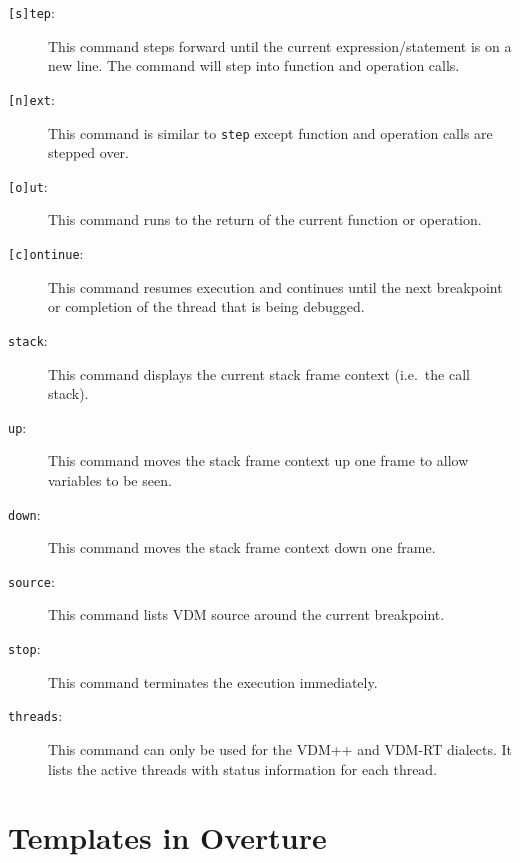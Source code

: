 \documentclass{overturerepchap}
\begin{document}
\begin{description}
\item[\texttt{[s]tep}:] This command steps forward until the
  current expression/statement is on a new line. The command will step
  into function and operation calls. 
\item[\texttt{[n]ext}:] This command is similar to \texttt{step} except
 function and operation calls are stepped over.  
\item[\texttt{[o]ut}:] This command runs to the return of the current
  function or operation. 
\item[\texttt{[c]ontinue}:] This command resumes execution and continues
  until the next breakpoint or completion of the thread that is being
  debugged. 
\item[\texttt{stack}:] This command displays the current stack frame
  context (i.e.\ the call stack). 
\item[\texttt{up}:] This command moves the stack frame context up one
  frame to allow variables to be seen.  
\item[\texttt{down}:] This command moves the stack frame context down
  one frame.  
\item[\texttt{source}:] This command lists VDM source around the
  current breakpoint.  
\item[\texttt{stop}:] This command terminates the execution
  immediately.  
\item[\texttt{threads}:] This command can only be used for the VDM++
  and VDM-RT dialects. It lists the active threads with status
  information for each thread. 
\end{description}

\appendix
\newpage





\newpage
\chapter{Templates in Overture}\label{app:templates}
\end{document}

